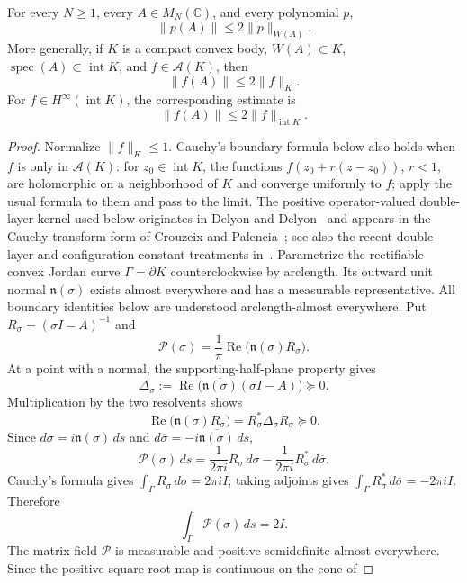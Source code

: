 \documentclass[preprints,article,submit,oneauthor]{Definitions/mdpi}
\numberwithin{equation}{section}
\newcommand{\C}{\mathbb C}
\newcommand{\spec}{\operatorname{spec}}
\newcommand{\Rea}{\operatorname{Re}}
\newcommand{\Int}{\operatorname{int}}
\begin{document}
\begin{Proposition}\label{prop:sharp}
For every \(N\geq1\), every \(A\in M_N(\C)\), and every polynomial \(p\),
\[
 \|p(A)\|\leq2\|p\|_{W(A)}.                          \tag{3.3}
\]
More generally, if \(K\) is a compact convex body,
\(W(A)\subset K\), \(\spec(A)\subset\Int K\), and \(f\in\mathcal A(K)\), then
\[
 \|f(A)\|\leq2\|f\|_K.                               \tag{3.4}
\]
For \(f\in H^\infty(\Int K)\), the corresponding estimate is
\[
 \|f(A)\|\leq2\|f\|_{\Int K}.
\]
\end{Proposition}

\begin{proof}
Normalize \(\|f\|_K\leq1\).  Cauchy's boundary formula below also holds when
\(f\) is only in \(\mathcal A(K)\): for \(z_0\in\Int K\), the functions
\(f(z_0+r(z-z_0))\), \(r<1\), are holomorphic on a neighborhood of \(K\) and
converge uniformly to \(f\); apply the usual formula to them and pass to the
limit.  The positive operator-valued double-layer kernel used below originates
in Delyon and Delyon~\cite{DelyonDelyon1999} and appears in the
Cauchy-transform form of Crouzeix and Palencia~\cite{CrouzeixPalencia2017};
see also the recent double-layer and configuration-constant treatments
in~\cite{SchwenningerDeVries2025,MalmanEtAl2025}.  Parametrize the
rectifiable convex Jordan curve
\(\Gamma=\partial K\) counterclockwise by arclength.  Its outward unit normal
\(\mathfrak n(\sigma)\) exists almost everywhere and has a measurable
representative.  All boundary identities below are understood
arclength-almost everywhere.  Put
\(R_\sigma=(\sigma I-A)^{-1}\) and
\[
 \mathcal P(\sigma)=\frac1\pi\Rea\bigl(\mathfrak n(\sigma)R_\sigma\bigr).
\]
At a point with a normal, the supporting-half-plane property gives
\[
 \Delta_\sigma:=\Rea\bigl(\overline{\mathfrak n(\sigma)}(\sigma I-A)\bigr)\succeq0.
\]
Multiplication by the two resolvents shows
\[
 \Rea\bigl(\mathfrak n(\sigma)R_\sigma\bigr)
 =R_\sigma^*\Delta_\sigma R_\sigma\succeq0.          \tag{3.5}
\]
Since \(d\sigma=i\mathfrak n(\sigma)\,ds\) and
\(d\overline\sigma=-i\overline{\mathfrak n(\sigma)}\,ds\),
\[
 \mathcal P(\sigma)\,ds
 =\frac1{2\pi i}R_\sigma\,d\sigma
  -\frac1{2\pi i}R_\sigma^*\,d\overline\sigma.
\]
Cauchy's formula gives \(\int_\Gamma R_\sigma\,d\sigma=2\pi iI\); taking
adjoints gives
\(\int_\Gamma R_\sigma^*\,d\overline\sigma=-2\pi iI\).  Therefore
\[
 \int_\Gamma \mathcal P(\sigma)\,ds=2I.              \tag{3.6}
\]
The matrix field \(\mathcal P\) is measurable and positive semidefinite almost
everywhere.  Since the positive-square-root map is continuous on the cone of

\end{proof}
\end{document}
